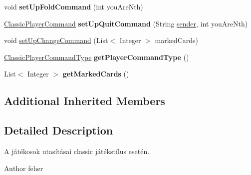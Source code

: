 \begin{DoxyCompactItemize}
\item 
\hypertarget{classhu_1_1elte_1_1bfw1p6_1_1poker_1_1command_1_1classic_1_1_classic_player_command_a2ec00d1f7e3080dbc042baad09749cca}{}void {\bfseries set\+Up\+Fold\+Command} (int you\+Are\+Nth)\label{classhu_1_1elte_1_1bfw1p6_1_1poker_1_1command_1_1classic_1_1_classic_player_command_a2ec00d1f7e3080dbc042baad09749cca}

\item 
\hypertarget{classhu_1_1elte_1_1bfw1p6_1_1poker_1_1command_1_1classic_1_1_classic_player_command_a3b59efd0e4664ff02c8847050daa57c9}{}\hyperlink{classhu_1_1elte_1_1bfw1p6_1_1poker_1_1command_1_1classic_1_1_classic_player_command}{Classic\+Player\+Command} {\bfseries set\+Up\+Quit\+Command} (String \hyperlink{classhu_1_1elte_1_1bfw1p6_1_1poker_1_1command_1_1_player_command_aadab45496b9dd59dc734f14e574db2ca}{sender}, int you\+Are\+Nth)\label{classhu_1_1elte_1_1bfw1p6_1_1poker_1_1command_1_1classic_1_1_classic_player_command_a3b59efd0e4664ff02c8847050daa57c9}

\item 
void \hyperlink{classhu_1_1elte_1_1bfw1p6_1_1poker_1_1command_1_1classic_1_1_classic_player_command_a4b8958a05c83e99e785227bc0ff16ac2}{set\+Up\+Change\+Command} (List$<$ Integer $>$ marked\+Cards)
\item 
\hypertarget{classhu_1_1elte_1_1bfw1p6_1_1poker_1_1command_1_1classic_1_1_classic_player_command_ad8cf8af1c26e5d7695d054a41b29167c}{}\hyperlink{enumhu_1_1elte_1_1bfw1p6_1_1poker_1_1command_1_1classic_1_1type_1_1_classic_player_command_type}{Classic\+Player\+Command\+Type} {\bfseries get\+Player\+Command\+Type} ()\label{classhu_1_1elte_1_1bfw1p6_1_1poker_1_1command_1_1classic_1_1_classic_player_command_ad8cf8af1c26e5d7695d054a41b29167c}

\item 
\hypertarget{classhu_1_1elte_1_1bfw1p6_1_1poker_1_1command_1_1classic_1_1_classic_player_command_af5089dd8e4abb9fb3f8f2bcbd07e3cd9}{}List$<$ Integer $>$ {\bfseries get\+Marked\+Cards} ()\label{classhu_1_1elte_1_1bfw1p6_1_1poker_1_1command_1_1classic_1_1_classic_player_command_af5089dd8e4abb9fb3f8f2bcbd07e3cd9}

\end{DoxyCompactItemize}
\subsection*{Additional Inherited Members}


\subsection{Detailed Description}
A játékosok utasításai classic játékstílus esetén. \begin{DoxyAuthor}{Author}
feher 
\end{DoxyAuthor}


